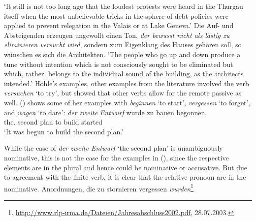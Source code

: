 \glt `It still is not too long ago that the loudest protests were heard in the Thurgau itself 
when the most unbelievable tricks in the sphere of debt policies were applied to prevent relegation in the Valais or at Lake Geneva.' 
\ex Die Auf- und Absteigenden erzeugen ungewollt einen Ton, \emph{der bewusst nicht als lästig zu eliminieren versucht wird}, 
    sondern zum Eigenklang des Hauses gehören soll, so wünschen es sich die Architekten.\footnotemark
{}
\glt `The people who go up and down produce a tune without intention which is not consciously sought to
be eliminated but which, rather, belongs to the individual sound of the building, as the
architects intended.'
\zl
Höhle's examples, other examples from the literature involved the verb \emph{versuchen} `to try',
but \citet{Wurmbrand2003a} showed that other verbs allow for the remote passive as well. ()
shows some of her examples with \emph{beginnen} `to start', \emph{vergessen} `to forget', and
\emph{wagen} `to dare':
\eal
\ex
\gll \emph{der} \emph{zweite} \emph{Entwurf} wurde  zu bauen begonnen,\footnotemark\\
     the.\NOM{} second        plan           \AUX{} to build started\\ 
\glt `It was begun to build the second plan.' 
\zl

While the case of \emph{der zweite Entwurf} `the second plan' is unambiguously nominative, this is
not the case for the examples in (), since the respective elements are in the
plural and hence could be nominative or accusative. But due to agreement with the finite verb, it is
clear that the relative pronoun are in the nominative.
\eal
\ex Anordnungen, die zu stornieren vergessen \emph{wurden}\footnote{
        \url{http://www.rlp-irma.de/Dateien/Jahresabschluss2002.pdf}, 28.07.2003.
}


